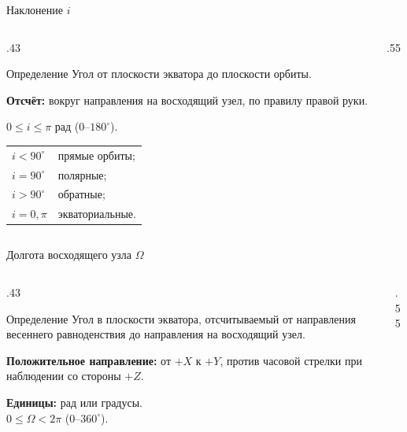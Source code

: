\documentclass[11pt,aspectratio=169,t]{beamer}
\begin{document}
\begin{frame}{Наклонение $i$}
\begin{columns}[T,onlytextwidth]
\begin{column}{.43\textwidth}
\begin{block}{Определение}
\justifying
Угол от плоскости экватора до плоскости орбиты.
\end{block}
\par
\textbf{Отсчёт:} вокруг направления на восходящий узел, по правилу правой руки.
\par
$0\le i\le\pi$ рад \quad ($0$--$180^\circ$).
\par
\begin{tabular}{@{}ll@{}}
$i<90^\circ$ & прямые орбиты;\\
$i=90^\circ$ & полярные;\\
$i>90^\circ$ & обратные;\\
$i=0,\pi$ & экваториальные.
\end{tabular}
\end{column}
\begin{column}{.55\textwidth}
\centering

\end{column}
\end{columns}
\end{frame}

\begin{frame}{Долгота восходящего узла $\Omega$}
\begin{columns}[T,onlytextwidth]
\begin{column}{.43\textwidth}
\begin{block}{Определение}
\justifying
Угол в плоскости экватора, отсчитываемый от направления весеннего равноденствия до направления на восходящий узел.
\end{block}
\textbf{Положительное направление:} от $+X$ к $+Y$, против часовой стрелки при наблюдении со стороны $+Z$.
\par\medskip
\textbf{Единицы:} рад или градусы.\\
$0\le\Omega<2\pi$ \quad ($0$--$360^\circ$).
\end{column}
\begin{column}{.55\textwidth}
\centering

\end{column}
\end{columns}
\end{frame}
\end{document}
